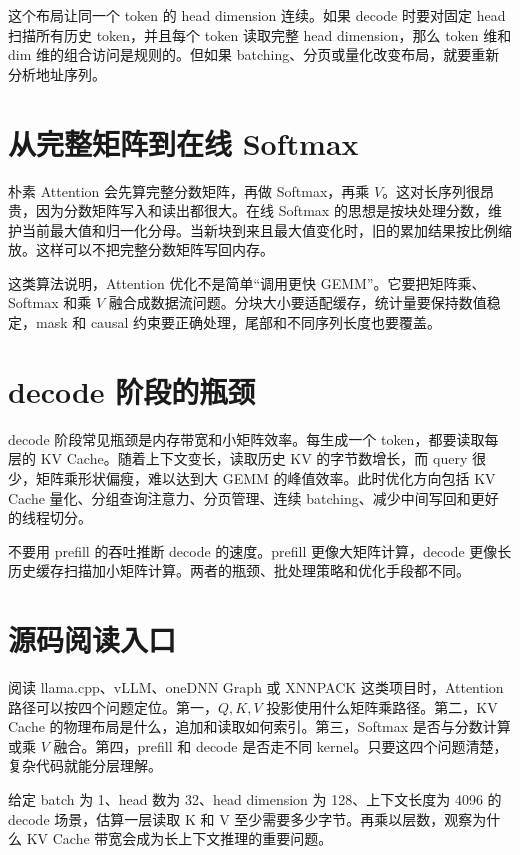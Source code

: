 这个布局让同一个 token 的 head dimension 连续。如果 decode 时要对固定 head 扫描所有历史 token，并且每个 token 读取完整 head dimension，那么 token 维和 dim 维的组合访问是规则的。但如果 batching、分页或量化改变布局，就要重新分析地址序列。

\section{从完整矩阵到在线 Softmax}

朴素 Attention 会先算完整分数矩阵，再做 Softmax，再乘 $V$。这对长序列很昂贵，因为分数矩阵写入和读出都很大。在线 Softmax 的思想是按块处理分数，维护当前最大值和归一化分母。当新块到来且最大值变化时，旧的累加结果按比例缩放。这样可以不把完整分数矩阵写回内存。

这类算法说明，Attention 优化不是简单“调用更快 GEMM”。它要把矩阵乘、Softmax 和乘 $V$ 融合成数据流问题。分块大小要适配缓存，统计量要保持数值稳定，mask 和 causal 约束要正确处理，尾部和不同序列长度也要覆盖。

\section{decode 阶段的瓶颈}

decode 阶段常见瓶颈是内存带宽和小矩阵效率。每生成一个 token，都要读取每层的 KV Cache。随着上下文变长，读取历史 KV 的字节数增长，而 query 很少，矩阵乘形状偏瘦，难以达到大 GEMM 的峰值效率。此时优化方向包括 KV Cache 量化、分组查询注意力、分页管理、连续 batching、减少中间写回和更好的线程切分。

\begin{warningbox}
不要用 prefill 的吞吐推断 decode 的速度。prefill 更像大矩阵计算，decode 更像长历史缓存扫描加小矩阵计算。两者的瓶颈、批处理策略和优化手段都不同。
\end{warningbox}

\section{源码阅读入口}

阅读 llama.cpp、vLLM、oneDNN Graph 或 XNNPACK 这类项目时，Attention 路径可以按四个问题定位。第一，$Q,K,V$ 投影使用什么矩阵乘路径。第二，KV Cache 的物理布局是什么，追加和读取如何索引。第三，Softmax 是否与分数计算或乘 $V$ 融合。第四，prefill 和 decode 是否走不同 kernel。只要这四个问题清楚，复杂代码就能分层理解。

\begin{exercisebox}
给定 batch 为 1、head 数为 32、head dimension 为 128、上下文长度为 4096 的 decode 场景，估算一层读取 K 和 V 至少需要多少字节。再乘以层数，观察为什么 KV Cache 带宽会成为长上下文推理的重要问题。
\end{exercisebox}
